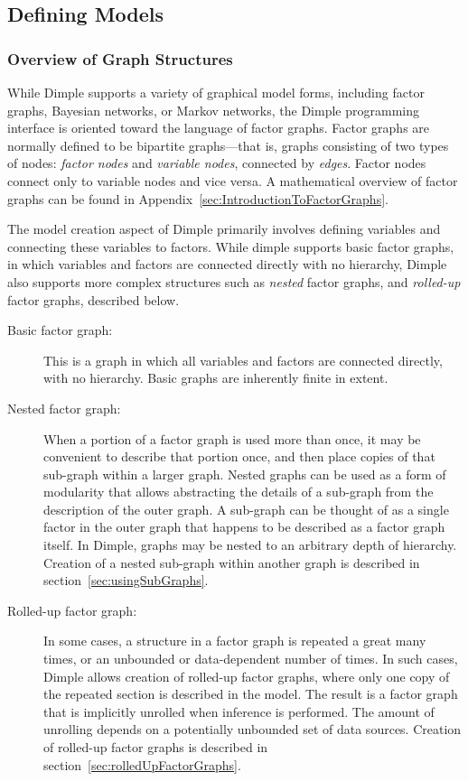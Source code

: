 \subsection{Defining Models}

\subsubsection{Overview of Graph Structures}

While Dimple supports a variety of graphical model forms, including factor graphs, Bayesian networks, or Markov networks, the Dimple programming interface is oriented toward the language of factor graphs.  Factor graphs are normally defined to be bipartite graphs---that is, graphs consisting of two types of nodes: \emph{factor nodes} and \emph{variable nodes}, connected by \emph{edges}.  Factor nodes connect only to variable nodes and vice versa.  A mathematical overview of factor graphs can be found in Appendix~\ref{sec:IntroductionToFactorGraphs}.

The model creation aspect of Dimple primarily involves defining variables and connecting these variables to factors.  While dimple supports basic factor graphs, in which variables and factors are connected directly with no hierarchy, Dimple also supports more complex structures such as \emph{nested} factor graphs, and \emph{rolled-up} factor graphs, described below.

\begin{description}
\item[Basic factor graph:] This is a graph in which all variables and factors are connected directly, with no hierarchy.  Basic graphs are inherently finite in extent.
\item[Nested factor graph:] When a portion of a factor graph is used more than once, it may be convenient to describe that portion once, and then place copies of that sub-graph within a larger graph.  Nested graphs can be used as a form of modularity that allows abstracting the details of a sub-graph from the description of the outer graph.  A sub-graph can be thought of as a single factor in the outer graph that happens to be described as a factor graph itself.  In Dimple, graphs may be nested to an arbitrary depth of hierarchy.  Creation of a nested sub-graph within another graph is described in section~\ref{sec:usingSubGraphs}.
\item[Rolled-up factor graph:] In some cases, a structure in a factor graph is repeated a great many times, or an unbounded or data-dependent number of times.  In such cases, Dimple allows creation of rolled-up factor graphs, where only one copy of the repeated section is described in the model.  The result is a factor graph that is implicitly unrolled when inference is performed.  The amount of unrolling depends on a potentially unbounded set of data sources.  Creation of rolled-up factor graphs is described in section~\ref{sec:rolledUpFactorGraphs}.
\end{description}

